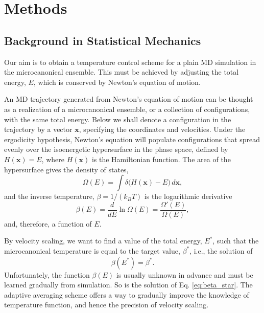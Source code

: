 \documentclass[reprint]{revtex4-1}
\begin{document}
\section{Methods}



\subsection{Background in Statistical Mechanics}



Our aim is to obtain a temperature control scheme
for a plain MD simulation in the microcanonical ensemble.
%
This must be achieved by adjusting the total energy, $E$,
which is conserved by Newton's equation of motion.


An MD trajectory generated from
Newton's equation of motion
can be thought as a realization
of a microcanonical ensemble,
or a collection of configurations,
with the same total energy.
%
Below we shall denote a configuration in the trajectory
by a vector $\mathbf x$,
specifying the coordinates and velocities.
%
Under the ergodicity hypothesis,
Newton's equation will populate configurations
that spread evenly over
the isoenergetic hypersurface in the phase space,
defined by
$H(\mathbf x) = E$,
where $H(\mathbf x)$ is the Hamiltonian function.
%
The area of the hypersurface gives the density of states,
%
\begin{equation}
  \Omega(E)
  =
  \int
    \delta\bigl( H(\mathbf x) - E \bigr)
    \, d\mathbf x
  ,
  \label{eq:omegaE}
\end{equation}
%
and the inverse temperature, $\beta = 1/(k_B T)$
is the logarithmic derivative
%
\begin{equation}
  \beta(E)
  =
  \frac{ d }{ dE }
  \ln \Omega(E)
  =
  \frac{ \Omega'(E) }
       { \Omega(E)  }
  ,
  \label{eq:betaE_def}
\end{equation}
%
and, therefore, a function of $E$.
%

By velocity scaling, we want to
find a value of the total energy, $E^*$,
such that the microcanonical temperature
is equal to the target value, $\beta^*$,
i.e., the solution of
%
\begin{equation}
  \beta(E^*)
  =
  \beta^*
  .
  \label{eq:beta_star}
\end{equation}
%
Unfortunately, the function $\beta(E)$
is usually unknown in advance
and must be learned gradually from simulation.
%
So is the solution of Eq. \eqref{eq:beta_star}.
%
The adaptive averaging scheme offers a way
to gradually improve the knowledge of temperature function,
and hence the precision of velocity scaling.
\end{document}
